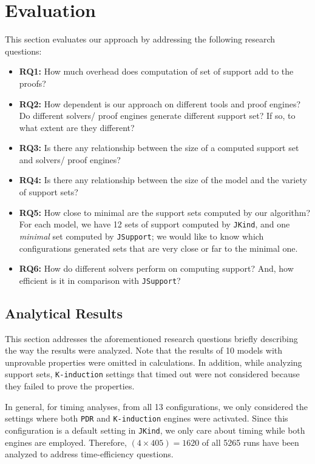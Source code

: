 \section{Evaluation}
\label{sec:eval}
This section evaluates our approach by addressing the following research questions:

\begin{itemize}
    \item \textbf{RQ1:} How much overhead does computation of set of support add to the proofs?
    \item \textbf{RQ2:} How dependent is our approach on different tools and proof engines? Do different solvers/ proof engines generate different support set? If so, to what extent are they different?
    \item \textbf{RQ3:} Is there any relationship between the size of a computed support set and
    solvers/ proof engines?
    \item \textbf{RQ4:} Is there any relationship between the size of the model and the variety of support sets?
    \item \textbf{RQ5:} How close to minimal are the support sets computed by our algorithm? For each model, we have 12 sets of support computed by \texttt{JKind}, and one \emph{minimal} set computed by \texttt{JSupport}; we would like to know which configurations generated sets that are very close or far to the minimal one.
    \item \textbf{RQ6:} How do different solvers perform on computing support? And, how efficient is it in comparison with \texttt{JSupport}?
\end{itemize}

\subsection{Analytical Results}
\label{sec:res}
This section addresses the aforementioned research questions briefly describing the way the results were analyzed. Note that the results of 10 models with unprovable properties were omitted in calculations. In addition, while analyzing support sets, \texttt{K-induction} settings that timed out were not considered because they failed to prove the properties.

In general, for timing analyses, from all 13 configurations, we only considered the settings where both \texttt{PDR} and \texttt{K-induction} engines were activated. Since this configuration is a default setting in \texttt{JKind}, we only care about timing while both engines are employed. Therefore, $(4 \times 405) = 1620$ of all 5265 runs have been analyzed to address time-efficiency questions.


